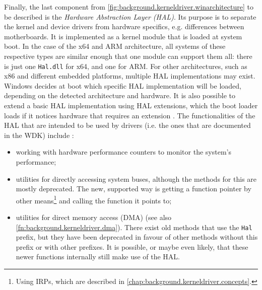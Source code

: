 Finally, the last component from \autoref{fig:background.kerneldriver.winarchitecture} to be described is the \emph{Hardware Abstraction Layer (HAL)}. Its purpose is to separate the kernel and device drivers from hardware specifics, e.g. differences between motherboards. It is implemented as a kernel module that is loaded at system boot. In the case of the x64 and ARM architecture, all systems of these respective types are similar enough that one module can support them all: there is just one \texttt{Hal.dll} for x64, and one for ARM. For other architectures, such as x86 and different embedded platforms, multiple HAL implementations may exist. Windows decides at boot which specific HAL implementation will be loaded, depending on the detected architecture and hardware. It is also possible to extend a basic HAL implementation using HAL extensions, which the boot loader loads if it notices hardware that requires an extension \cite{Yosifovich2017}. The functionalities of the HAL that are intended to be used by drivers (i.e. the ones that are documented in the WDK) include \cite{Wdk}:
\begin{itemize}
	\item working with hardware performance counters to monitor the system's performance;
	\item utilities for directly accessing system buses, although the methods for this are mostly deprecated. The new, supported way is getting a function pointer by other means\footnote{\label{fn:background.kerneldriver.funcpointerirp} Using IRPs, which are described in \autoref{chap:background.kerneldriver.concepts}.} and calling the function it points to;
	\item utilities for direct memory access (DMA) (see also \autoref{fn:background.kerneldriver.dma}). There exist old methods that use the \texttt{Hal} prefix, but they have been deprecated in favour of other methods without this prefix or with other prefixes. It is possible, or maybe even likely, that these newer functions internally still make use of the HAL.
\end{itemize}

